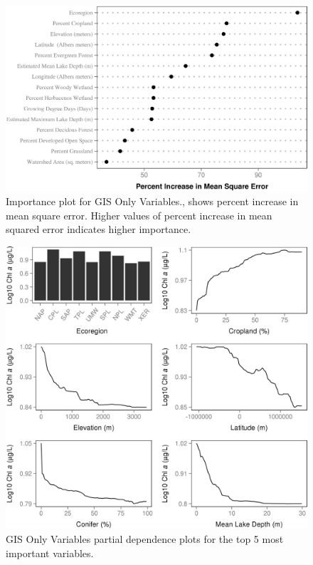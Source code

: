 \documentclass[12pt,]{article}
\begin{document}
\newpage

\begin{figure}[htbp]
\centering
\includegraphics{manuscript_files/figure-latex/GIS_Importance-1.jpeg}
\caption{Importance plot for GIS Only Variables., shows percent increase
in mean square error. Higher values of percent increase in mean squared
error indicates higher importance. \label{fig:GIS_Importance}}
\end{figure}

\newpage

\begin{figure}[htbp]
\centering
\includegraphics{manuscript_files/figure-latex/gis_partial_dependence-1.jpeg}
\caption{GIS Only Variables partial dependence plots for the top 5 most
important variables. \label{fig:gis_partial_dependence}}
\end{figure}
\end{document}
